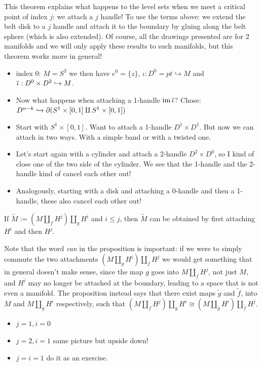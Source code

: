 \noindent This theorem explains what happens to the level sets when we meet a critical point of index $j$: we attach a $j$ handle! 
To use the terms above: we extend the belt disk to a $j$ handle and attach it to the boundary by gluing along the belt sphere (which is also extended).
Of course, all the drawings presented are for 2 manifolds and we will only apply these results to such manifolds, but this theorem works more in general! 

\begin{ex}
\hfill%
    \begin{itemize}
        \item index 0: $M=S^2$ %
        we then have $e^0 = \{z\}$, $\iota: D^0={pt} \hookrightarrow M$ and $\overline{\iota}: D^0 \times D^2 \hookrightarrow M$.
        \item Now what happens when attaching a 1-handle $\operatorname{im} \overline{\iota}$? %
        Chose: $D^{n-k} \hookrightarrow \partial (S^1 \times [0,1] \amalg S^1 \times [0,1])$
        \item Start with $S^1 \times [0,1]$. Want to attach a 1-handle $D^1 \times D^1$. %
        But now we can attach in two ways. With a simple band or with a twisted one.
        \item Let's start again with a cylinder and attach a 2-handle $D^2 \times D^0$, so I kind of close one of the two side of the cylinder. %
        We see that the 1-handle and the 2-handle kind of cancel each other out!
        \item Analogously, starting with a disk and attaching a 0-handle and then a 1-handle, these also cancel each other out!
    \end{itemize}
\end{ex}

\begin{prop}
    If $\tilde M := (M \coprod_f H^j) \coprod_g H^i$ and $i\leq j$, then $\tilde M$ can be obtained by first attaching $H^i$ and then $H^j$.
\end{prop}
\noindent Note that the word \textit{can} in the proposition is important: if we were to simply commute the two attachments $(M \coprod_g H^i) \coprod_f H^j$ we would get something that in general doesn't make sense, since the map $g$ goes into $M \coprod_f H^j$, not just $M$, and $H^i$ may no longer be attached at the boundary, leading to a space that is not even a manifold. The proposition instead says that there exist maps $\tilde g$ and $\tilde f$, into $M$ and $M \coprod_{\tilde g} H^i$ respectively, such that $(M \coprod_f H^j) \coprod_g H^i \cong (M \coprod_{\tilde g} H^i) \coprod_{\tilde f} H^j$.
\begin{ex} %
\hfill
    \begin{itemize}
        \item $j=1, i=0$ 
        \item $j=2, i=1$ same picture but upside down!
        \item $j=i=1$ do it as an exercise.
    \end{itemize}
\end{ex}

